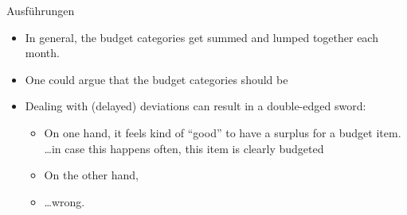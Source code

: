 Ausführungen
\begin{itemize}
	\item In general, the budget categories get summed and lumped together each month.
	\item One could argue that the budget categories should be 
	\item Dealing with (delayed) deviations can result in a double-edged sword:
	\begin{itemize}
		\item On one hand, it feels kind of ``good'' to have a surplus for a budget item.\\
		\ldots in case this happens often, this item is clearly budgeted
		\item On the other hand, 
		\item \ldots wrong.
	\end{itemize}
\end{itemize}